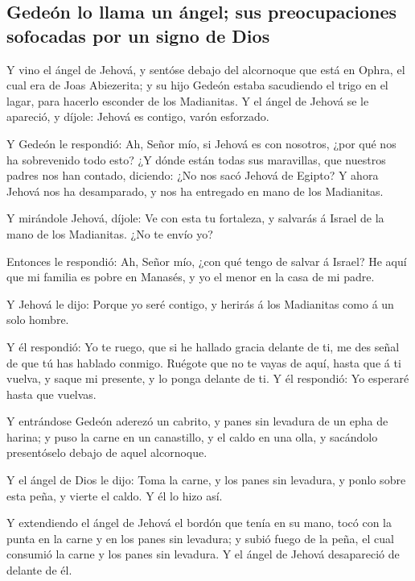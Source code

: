 \hypertarget{gedeuxf3n-lo-llama-un-uxe1ngel-sus-preocupaciones-sofocadas-por-un-signo-de-dios}{%
\subsection{Gedeón lo llama un ángel; sus preocupaciones sofocadas por
un signo de
Dios}\label{gedeuxf3n-lo-llama-un-uxe1ngel-sus-preocupaciones-sofocadas-por-un-signo-de-dios}}

 Y vino el ángel de Jehová, y sentóse debajo del
alcornoque que está en Ophra, el cual era de Joas Abiezerita; y su hijo
Gedeón estaba sacudiendo el trigo en el lagar, para hacerlo esconder de
los Madianitas.  Y el ángel de Jehová se le apareció, y
díjole: Jehová es contigo, varón esforzado.

 Y Gedeón le respondió: Ah, Señor mío, si Jehová es con
nosotros, ¿por qué nos ha sobrevenido todo esto? ¿Y dónde están todas
sus maravillas, que nuestros padres nos han contado, diciendo: ¿No nos
sacó Jehová de Egipto? Y ahora Jehová nos ha desamparado, y nos ha
entregado en mano de los Madianitas.

 Y mirándole Jehová, díjole: Ve con esta tu fortaleza, y
salvarás á Israel de la mano de los Madianitas. ¿No te envío yo?

 Entonces le respondió: Ah, Señor mío, ¿con qué tengo de
salvar á Israel? He aquí que mi familia es pobre en Manasés, y yo el
menor en la casa de mi padre.

 Y Jehová le dijo: Porque yo seré contigo, y herirás á
los Madianitas como á un solo hombre.

 Y él respondió: Yo te ruego, que si he hallado gracia
delante de ti, me des señal de que tú has hablado conmigo.
 Ruégote que no te vayas de aquí, hasta que á ti vuelva,
y saque mi presente, y lo ponga delante de ti. Y él respondió: Yo
esperaré hasta que vuelvas.

 Y entrándose Gedeón aderezó un cabrito, y panes sin
levadura de un epha de harina; y puso la carne en un canastillo, y el
caldo en una olla, y sacándolo presentóselo debajo de aquel alcornoque.

 Y el ángel de Dios le dijo: Toma la carne, y los panes
sin levadura, y ponlo sobre esta peña, y vierte el caldo. Y él lo hizo
así.

 Y extendiendo el ángel de Jehová el bordón que tenía en
su mano, tocó con la punta en la carne y en los panes sin levadura; y
subió fuego de la peña, el cual consumió la carne y los panes sin
levadura. Y el ángel de Jehová desapareció de delante de él.

